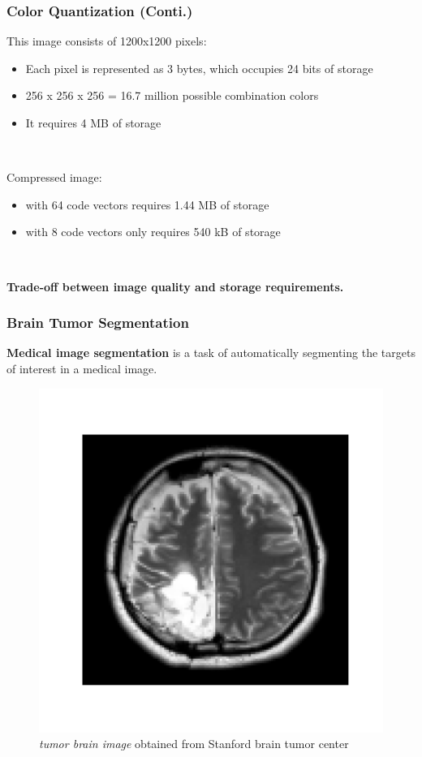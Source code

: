 \documentclass{beamer}
\begin{document}
\begin{frame}
\frametitle{Color Quantization (Conti.)}

This image consists of 1200x1200 pixels: 
\begin{itemize}
	\item Each pixel is represented as 3 bytes, which occupies 24 bits of storage
	\item 256 x 256 x 256 = 16.7 million possible combination colors
	\item It requires 4 MB of storage
\end{itemize}

\

Compressed image:
\begin{itemize}
	\item with 64 code vectors requires 1.44 MB of storage
	\item with 8 code vectors only requires 540 kB of storage
\end{itemize}

\

\textbf{Trade-off between image quality and storage requirements.}

\end{frame}



\begin{frame}
\frametitle{Brain Tumor Segmentation}

\textbf{Medical image segmentation} is a task of automatically segmenting the targets of interest in a medical image. 

\begin{figure}[h!]
  \centering
  \includegraphics[width=0.4\linewidth]{../Cluster_results/MRI/MRI.png}
  \caption{\textit{tumor brain image} obtained from Stanford brain tumor center}
\end{figure}

\end{frame}
\end{document}
